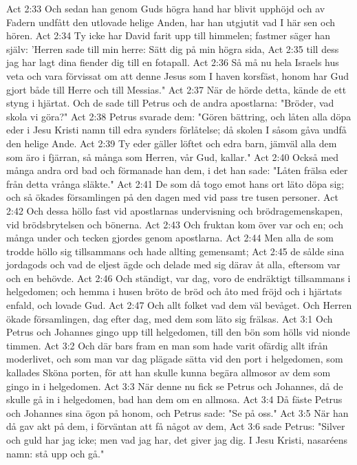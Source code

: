 Act 2:33  Och sedan han genom Guds högra hand har blivit upphöjd och av Fadern undfått den utlovade helige Anden, har han utgjutit vad I här sen och hören.
Act 2:34  Ty icke har David farit upp till himmelen; fastmer säger han själv: 'Herren sade till min herre: Sätt dig på min högra sida,
Act 2:35  till dess jag har lagt dina fiender dig till en fotapall.
Act 2:36  Så må nu hela Israels hus veta och vara förvissat om att denne Jesus som I haven korsfäst, honom har Gud gjort både till Herre och till Messias."
Act 2:37  När de hörde detta, kände de ett styng i hjärtat. Och de sade till Petrus och de andra apostlarna: "Bröder, vad skola vi göra?"
Act 2:38  Petrus svarade dem: "Gören bättring, och låten alla döpa eder i Jesu Kristi namn till edra synders förlåtelse; då skolen I såsom gåva undfå den helige Ande.
Act 2:39  Ty eder gäller löftet och edra barn, jämväl alla dem som äro i fjärran, så många som Herren, vår Gud, kallar."
Act 2:40  Också med många andra ord bad och förmanade han dem, i det han sade: "Låten frälsa eder från detta vrånga släkte."
Act 2:41  De som då togo emot hans ort läto döpa sig; och så ökades församlingen på den dagen med vid pass tre tusen personer.
Act 2:42  Och dessa höllo fast vid apostlarnas undervisning och brödragemenskapen, vid brödsbrytelsen och bönerna.
Act 2:43  Och fruktan kom över var och en; och många under och tecken gjordes genom apostlarna.
Act 2:44  Men alla de som trodde höllo sig tillsammans och hade allting gemensamt;
Act 2:45  de sålde sina jordagods och vad de eljest ägde och delade med sig därav åt alla, eftersom var och en behövde.
Act 2:46  Och ständigt, var dag, voro de endräktigt tillsammans i helgedomen; och hemma i husen bröto de bröd och åto med fröjd och i hjärtats enfald, och lovade Gud.
Act 2:47  Och allt folket vad dem väl bevåget. Och Herren ökade församlingen, dag efter dag, med dem som läto sig frälsas.
Act 3:1  Och Petrus och Johannes gingo upp till helgedomen, till den bön som hölls vid nionde timmen.
Act 3:2  Och där bars fram en man som hade varit ofärdig allt ifrån moderlivet, och som man var dag plägade sätta vid den port i helgedomen, som kallades Sköna porten, för att han skulle kunna begära allmosor av dem som gingo in i helgedomen.
Act 3:3  När denne nu fick se Petrus och Johannes, då de skulle gå in i helgedomen, bad han dem om en allmosa.
Act 3:4  Då fäste Petrus och Johannes sina ögon på honom, och Petrus sade: "Se på oss."
Act 3:5  När han då gav akt på dem, i förväntan att få något av dem,
Act 3:6  sade Petrus: "Silver och guld har jag icke; men vad jag har, det giver jag dig. I Jesu Kristi, nasaréens namn: stå upp och gå."
